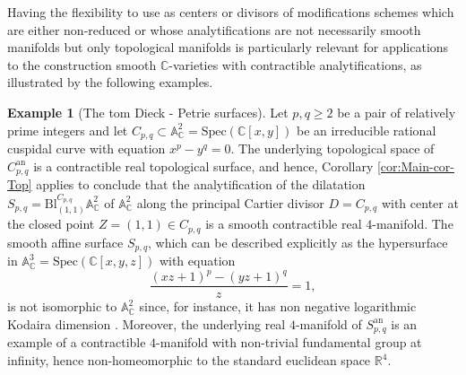 \documentclass[10pt]{alggeom}
\renewcommand{\geq}{\geqslant}
\theoremstyle{definition}
\newtheorem{ex}[thm]{Example}
\numberwithin{equation}{section}
\begin{document}
Having the flexibility to use as centers or divisors of modifications
schemes which are either non-reduced or whose analytifications are
not necessarily smooth manifolds but only topological manifolds is
particularly relevant for applications to the construction smooth
$\mathbb{C}$-varieties with contractible analytifications, as illustrated
by the following examples.
\begin{ex}[The tom Dieck - Petrie surfaces]
\label{exa:.-tom-Dieck-Petrie-surfaces} Let $p,q\geq2$ be a pair
of relatively prime integers and let $C_{p,q}\subset\mathbb{A}_{\mathbb{C}}^{2}=\mathrm{Spec}(\mathbb{C}[x,y])$
be an irreducible rational cuspidal curve with equation $x^{p}-y^{q}=0$.
The underlying topological space of $C_{p,q}^{\mathrm{an}}$ is a
contractible real topological surface, and hence, Corollary \ref{cor:Main-cor-Top}
applies to conclude that the analytification of the dilatation $S_{p,q}=\mathrm{Bl}_{(1,1)}^{C_{p,q}}\mathbb{A}_{\mathbb{C}}^{2}$
of $\mathbb{A}_{\mathbb{C}}^{2}$ along the principal Cartier divisor
$D=C_{p,q}$ with center at the closed point $Z=(1,1)\in C_{p,q}$
is a smooth contractible real $4$-manifold. The smooth affine surface
$S_{p,q}$, which can be described explicitly as the hypersurface
in $\mathbb{A}_{\mathbb{C}}^{3}=\mathrm{Spec}(\mathbb{C}[x,y,z])$
with equation 
\[
\frac{(xz+1)^{p}-(yz+1)^{q}}{z}=1,
\]
is not isomorphic to $\mathbb{A}_{\mathbb{C}}^{2}$ since, for instance,
it has non negative logarithmic Kodaira dimension \cite[Example 2.4]{Zai00}.
Moreover, the underlying real $4$-manifold of $S_{p,q}^{\mathrm{an}}$
is an example of a contractible $4$-manifold with non-trivial fundamental
group at infinity, hence non-homeomorphic to the standard euclidean
space $\mathbb{R}^{4}$. 
\end{ex}
\end{document}
